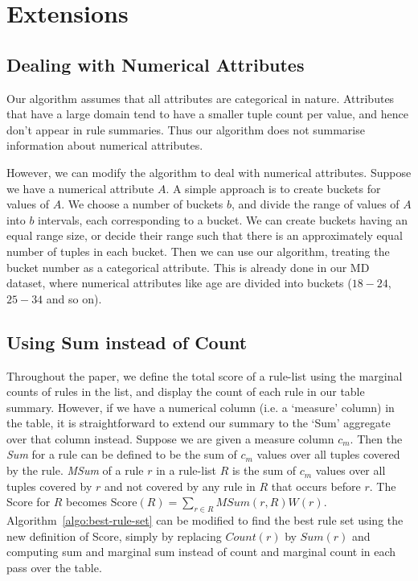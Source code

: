 \documentclass[10pt,journal,compsoc]{IEEEtran}
\newcommand{\techreporttext}[1]{#1}
\begin{document}
\techreporttext{
\section{Extensions}\label{sec:extensions}
\subsection{Dealing with Numerical Attributes}\label{sec:extensions-numerical}
Our algorithm assumes that all attributes are categorical in nature. Attributes that have a large domain tend to have a smaller tuple count per value, and hence don't appear in rule summaries. Thus our algorithm does not summarise information about numerical attributes. 

However, we can modify the algorithm to deal with numerical attributes. Suppose we have a numerical attribute $A$. A simple approach is to create buckets for values of $A$. We choose a number of buckets $b$, and divide the range of values of $A$ into $b$ intervals, each corresponding to a bucket. We can create buckets having an equal range size, or decide their range such that there is an approximately equal number of tuples in each bucket. Then we can use our algorithm, treating the bucket number as a categorical attribute. This is already done in our MD dataset, where numerical attributes like age are divided into buckets ($18-24$, $25-34$ and so on).

\subsection{Using Sum instead of Count}\label{sec:extensions-sum}
Throughout the paper, we define the total score of a rule-list using the marginal counts of rules in the list, and display the count of each rule in our table summary. However, if we have a numerical column (i.e. a `measure' column) in the table, it is straightforward to extend our summary to the `Sum' aggregate over that column instead. Suppose we are given a measure column $c_m$. Then the {\em Sum} for a rule can be defined to be the sum of $c_m$ values over all tuples covered by the rule. {\em MSum} of a rule $r$ in a rule-list $R$ is the sum of $c_m$ values over all tuples covered by $r$ and not covered by any rule in $R$ that occurs before $r$. The Score for $R$ becomes $\text{Score}(R) = \sum_{r\in R} MSum(r,R)W(r)$. Algorithm~\ref{algo:best-rule-set} can be modified to find the best rule set using the new definition of Score, simply by replacing $Count(r)$ by $Sum(r)$ and computing sum and marginal sum instead of count and marginal count in each pass over the table.
}
\end{document}
